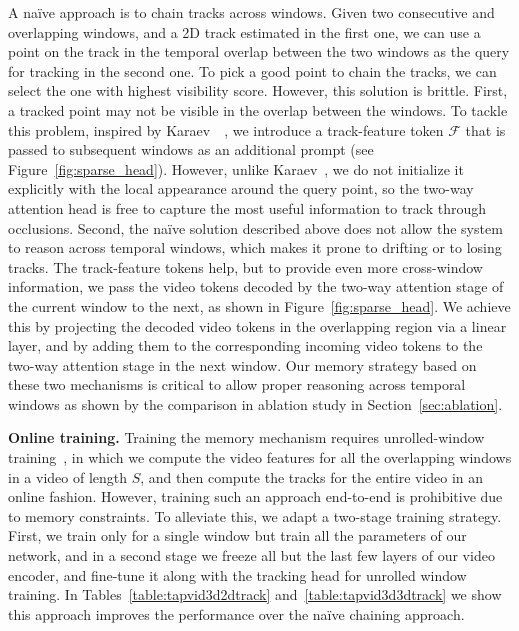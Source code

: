 A na\"{i}ve approach is to chain tracks across windows.
Given two consecutive and overlapping windows, and a 2D track estimated in the first one, we can use a point on the track in the temporal overlap between the two windows as the query for tracking in the second one.
To pick a good point to chain the tracks, we can select the one with highest visibility score.
However, this solution is brittle.
First, a tracked point may not be visible in the overlap between the windows.
To tackle this problem, inspired by Karaev~\etal~\cite{karaev2023cotracker}, we introduce a track-feature token $\mathcal{F}$ that is passed to subsequent windows as an additional prompt (see Figure~\ref{fig:sparse_head}).
However, unlike Karaev~\etal, we do not initialize it explicitly with the local appearance around the query point, so the two-way attention head is free to capture the most useful information to track through occlusions.
Second, the na\"{i}ve solution described above does not allow the system to reason across temporal windows, which makes it prone to drifting or to losing tracks.
The track-feature tokens help, but to provide even more cross-window information, we pass the video tokens decoded by the two-way attention stage of the current window to the next, as shown in Figure~\ref{fig:sparse_head}.
We achieve this by projecting the decoded video tokens in the overlapping region via a linear layer, and by adding them to the corresponding incoming video tokens to the two-way attention stage in the next window.
Our memory strategy based on these two mechanisms is critical to allow proper reasoning across temporal windows as shown by the comparison in ablation study in Section~\ref{sec:ablation}.


\noindent\textbf{Online training.} Training the memory mechanism requires unrolled-window training~\cite{karaev2023cotracker}, in which we compute the video features for all the overlapping windows in a video of length $S$, and then compute the tracks for the entire video in an online fashion.
However, training such an approach end-to-end is prohibitive due to memory constraints.
To alleviate this, we adapt a two-stage training strategy.
First, we train only for a single window but train all the parameters of our network, and in a second stage we freeze all but the last few layers of our video encoder, and fine-tune it along with the tracking head for unrolled window training.
In Tables~\ref{table:tapvid3d2dtrack} and~\ref{table:tapvid3d3dtrack} we show this approach improves the performance over the na\"{i}ve chaining approach.
